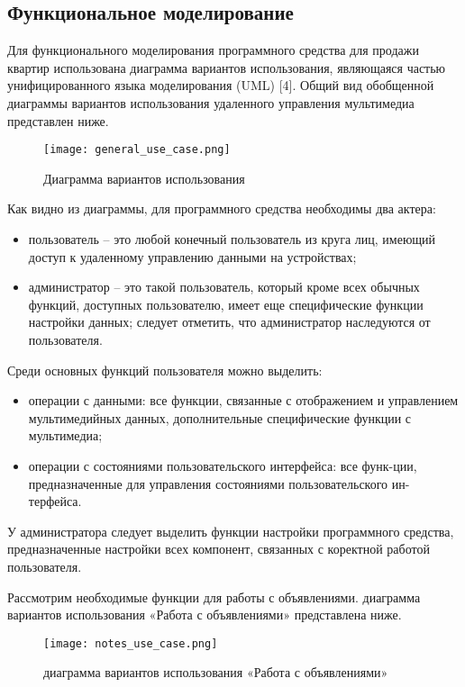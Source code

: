 \subsection{Функциональное моделирование}

Для функционального моделирования программного средства для продажи квартир использована диаграмма вариантов использования, являющаяся частью унифицированного языка моделирования (UML) [4].
Общий вид обобщенной диаграммы вариантов использования удаленного управления мультимедиа представлен ниже.

\begin{figure}[!htb]
	\centering
	\texttt{[image: general\_use\_case.png]}
	\caption{ Диаграмма вариантов использования}
	\label{fig:arch_and_mod::lexer_flow}
	\clearpage
\end{figure}

Как видно из диаграммы, для программного средства необходимы два актера:

\begin{itemize}
	\item пользователь – это любой конечный пользователь из круга лиц, имеющий доступ к удаленному управлению данными на устройствах;
	\item администратор – это такой пользователь, который кроме всех обычных функций, доступных пользователю, имеет еще специфические функции настройки данных; следует отметить, что администратор наследуются от пользователя.
\end{itemize}

Среди основных функций пользователя можно выделить:

\begin{itemize}
	\item операции с данными: все функции, связанные с отображением и управлением мультимедийных данных, дополнительные специфические функции с мультимедиа;
	\item операции с состояниями пользовательского интерфейса: все функ-ции, предназначенные для управления состояниями пользовательского ин-терфейса.
\end{itemize}

У администратора следует выделить функции настройки программного средства, предназначенные настройки всех компонент, связанных с коректной работой пользователя.

Рассмотрим необходимые функции для работы с объявлениями. диаграмма вариантов использования «Работа с объявлениями» представлена ниже.

\begin{figure}[!htb]
	\centering
	\texttt{[image: notes\_use\_case.png]}
	\caption{ диаграмма вариантов использования «Работа с объявлениями»}
	\label{fig:arch_and_mod::lexer_flow}
	\clearpage
\end{figure}

